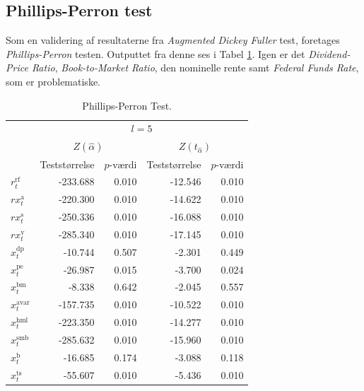 \documentclass[
  a4paper,
  oneside]{memoir}
\begin{document}
\hypertarget{philper}{%
\subsection{Phillips-Perron test}\label{philper}}

Som en validering af resultaterne fra \emph{Augmented Dickey Fuller} test, foretages \emph{Phillips-Perron} testen. Outputtet fra denne ses i Tabel \ref{tab:STAT-PP}. Igen er det \emph{Dividend-Price Ratio}, \emph{Book-to-Market Ratio}, den nominelle rente samt \emph{Federal Funds Rate}, som er problematiske.

\begin{table}[H]

\caption{\label{tab:STAT-PP}Phillips-Perron Test.}
\centering
\begin{threeparttable}
\begin{tabular}[t]{lrrrr}
\toprule
\multicolumn{1}{c}{ } & \multicolumn{4}{c}{$l=5$} \\
\cmidrule(l{3pt}r{3pt}){2-5}
\multicolumn{1}{c}{ } & \multicolumn{2}{c}{$Z(\hat{\alpha})$} & \multicolumn{2}{c}{$Z(t_{\hat{\alpha}})$} \\
\cmidrule(l{3pt}r{3pt}){2-3} \cmidrule(l{3pt}r{3pt}){4-5}
  & Teststørrelse & $p$-værdi & Teststørrelse & $p$-værdi\\
\midrule
\rowcolor{gray!6}  $r_t^{\text{rf}}$ & -233.688 & 0.010 & -12.546 & 0.010\\
$rx_t^{\text{a}}$ & -220.300 & 0.010 & -14.622 & 0.010\\
\rowcolor{gray!6}  $rx_t^{\text{s}}$ & -250.336 & 0.010 & -16.088 & 0.010\\
$rx_t^{\text{v}}$ & -285.340 & 0.010 & -17.145 & 0.010\\
\rowcolor{gray!6}  $x_t^{\text{dp}}$ & -10.744 & 0.507 & -2.301 & 0.449\\
$x_t^{\text{pe}}$ & -26.987 & 0.015 & -3.700 & 0.024\\
\rowcolor{gray!6}  $x_t^{\text{bm}}$ & -8.338 & 0.642 & -2.045 & 0.557\\
$x_t^{\text{avar}}$ & -157.735 & 0.010 & -10.522 & 0.010\\
\rowcolor{gray!6}  $x_t^{\text{hml}}$ & -223.350 & 0.010 & -14.277 & 0.010\\
$x_t^{\text{smb}}$ & -285.632 & 0.010 & -15.960 & 0.010\\
\rowcolor{gray!6}  $x_t^{\text{b}}$ & -16.685 & 0.174 & -3.088 & 0.118\\
$x_t^{\text{ts}}$ & -55.607 & 0.010 & -5.436 & 0.010\\

\end{tabular}
\end{threeparttable}
\end{table}
\end{document}
